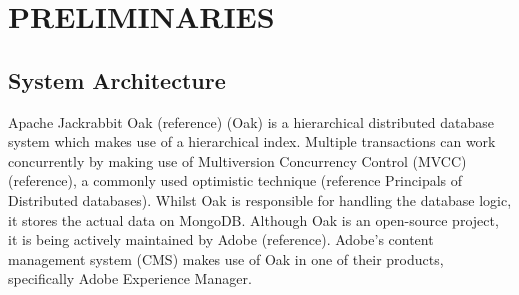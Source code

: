 \documentclass[abstracton,12pt]{scrreprt}
\begin{document}
\chapter{PRELIMINARIES}

\section{System Architecture}

Apache Jackrabbit Oak (reference) (Oak) is a hierarchical distributed database system which makes use of a hierarchical index. 
Multiple transactions can work concurrently by making use of Multiversion Concurrency Control (MVCC) (reference), a commonly used optimistic technique (reference Principals of Distributed databases).
Whilst Oak is responsible for handling the database logic, it stores the actual data on MongoDB.
Although Oak is an open-source project, it is being actively maintained by Adobe (reference).
Adobe's content management system (CMS) makes use of Oak in one of their products, specifically Adobe Experience Manager.
\end{document}
